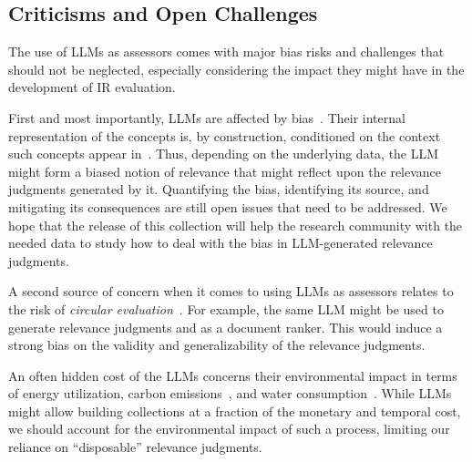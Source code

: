 \subsection{Criticisms and Open Challenges}
The use of \acp{LLM} as assessors comes with major bias risks and challenges that should not be neglected, especially considering the impact they might have in the development of \ac{IR} evaluation.

First and most importantly, \acp{LLM} are affected by bias~\cite{DBLP:conf/fat/BenderGMS21}. Their internal representation of the concepts is, by construction, conditioned on the context such concepts appear in~\cite{DBLP:conf/nips/VaswaniSPUJGKP17}. Thus, depending on the underlying data, the \ac{LLM} might form a biased notion of relevance that might reflect upon the relevance judgments generated by it. Quantifying the bias, identifying its source, and mitigating its consequences are still open issues that need to be addressed. We hope that the release of this collection will help the research community with the needed data to study how to deal with the bias in \ac{LLM}-generated relevance judgments.

A second source of concern when it comes to using \acp{LLM} as assessors relates to the risk of \textit{circular evaluation}~\cite{faggioli2023perspectives,DBLP:journals/corr/abs-2409-15133}. For example, the same \ac{LLM} might be used to generate relevance judgments and as a document ranker. This would induce a strong bias on the validity and generalizability of the relevance judgments.

An often hidden cost of the \acp{LLM} concerns their environmental impact in terms of energy utilization, carbon emissions~\cite{DBLP:journals/corr/abs-2408-09713,DBLP:conf/sigir/ScellsZZ22}, and water consumption~\cite{DBLP:conf/ictir/ZucconSZ23}.
While \acp{LLM} might allow building collections at a fraction of the monetary and temporal cost, we should account for the environmental impact of such a process, limiting our reliance on ``disposable'' relevance judgments.


